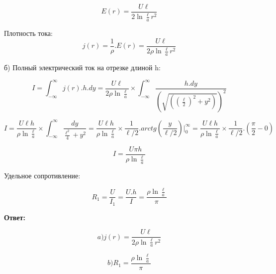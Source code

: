 $$E(r) = \frac{U \ell}{2 \ln{\frac{\ell}{a}}r^2}$$

Плотность тока:
$$j(r) = \frac{1}{\rho}.E(r) = \frac{U \ell }{2 \rho \ln{\frac{\ell}{a}r^2}}$$

б) Полный электрический ток на отрезке длиной h:

$$I = \displaystyle \int_{-\infty}^{\infty} j(r).h.dy = \frac{U \ell}{2 \rho \ln{\frac{\ell}{a}}} \times \displaystyle \int_{-\infty}^{\infty} \frac{h.dy}{(\sqrt{((\frac{\ell}{2})^2 + y^2)})^2} $$

$$I = \frac{U \ell h}{\rho \ln{\frac{\ell}{a}}} \times  \displaystyle \int_{-\infty}^{\infty} \frac{dy}{\frac{\ell^2}{4} + y^2}=  \frac{U \ell h}{\rho \ln{\frac{\ell}{a}}} \times \frac{1}{\ell/2} . arctg(\frac{y}{\ell/2}) |_{0}^{\infty} =  \frac{U \ell h}{\rho \ln{\frac{\ell}{a}}} \times \frac{1}{\ell/2} . (\frac{\pi}{2} - 0)$$

$$I = \frac{U\pi h}{\rho \ln{\frac{\ell}{a}}}$$

Удельное сопротивление:

$$R_1 = \frac{U}{I_1} = \frac{U.h}{I}  = \frac{\rho \ln{\frac{\ell}{a}}}{\pi}$$

\textbf{Ответ:}

$$a) j(r) = \frac{U \ell }{2 \rho \ln{\frac{\ell}{a}r^2}}$$

$$b) R_1 = \frac{\rho \ln{\frac{\ell}{a}}}{\pi}$$









